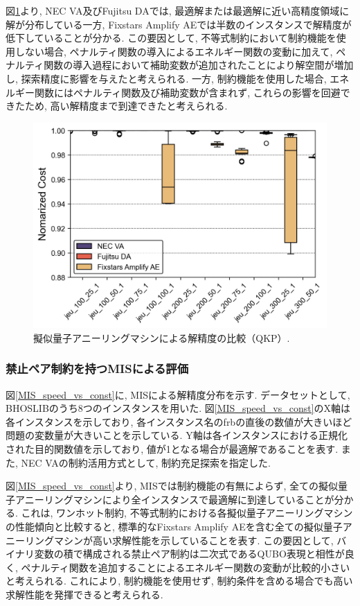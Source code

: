 \documentclass[submit,techrep,noauthor]{ipsj}
\begin{document}
図\ref{QKP_speed_vs_const}より, NEC VA及びFujitsu DAでは, 最適解または最適解に近い高精度領域に解が分布している一方, Fixstars Amplify AEでは半数のインスタンスで解精度が低下していることが分かる. この要因として, 不等式制約において制約機能を使用しない場合, ペナルティ関数の導入によるエネルギー関数の変動に加えて, ペナルティ関数の導入過程において補助変数が追加されたことにより解空間が増加し, 探索精度に影響を与えたと考えられる. 一方, 制約機能を使用した場合, エネルギー関数にはペナルティ関数及び補助変数が含まれず, これらの影響を回避できたため, 高い解精度まで到達できたと考えられる.

\begin{figure}[t]
\centering
\includegraphics[bb=0 0 700 280, width=15cm]{speed_vs_constraint_QKP.png}
\caption{擬似量子アニーリングマシンによる解精度の比較（QKP）.}
\label{QKP_speed_vs_const}
\end{figure}
\subsubsection{禁止ペア制約を持つMISによる評価}
図\ref{MIS_speed_vs_const}に, MISによる解精度分布を示す. データセットとして, BHOSLIB\cite{mislib}のうち8つのインスタンスを用いた. 図\ref{MIS_speed_vs_const}のX軸は各インスタンスを示しており, 各インスタンス名のfrbの直後の数値が大きいほど問題の変数量が大きいことを示している. Y軸は各インスタンスにおける正規化された目的関数値を示しており, 値が1となる場合が最適解であることを表す. また, NEC VAの制約活用方式として, 制約充足探索を指定した. 

図\ref{MIS_speed_vs_const}より, MISでは制約機能の有無によらず, 全ての擬似量子アニーリングマシンにより全インスタンスで最適解に到達していることが分かる. これは, ワンホット制約, 不等式制約における各擬似量子アニーリングマシンの性能傾向と比較すると, 標準的なFixstars Amplify AEを含む全ての擬似量子アニーリングマシンが高い求解性能を示していることを表す. この要因として, バイナリ変数の積で構成される禁止ペア制約は二次式であるQUBO表現と相性が良く, ペナルティ関数を追加することによるエネルギー関数の変動が比較的小さいと考えられる. これにより, 制約機能を使用せず, 制約条件を含める場合でも高い求解性能を発揮できると考えられる.
\end{document}
